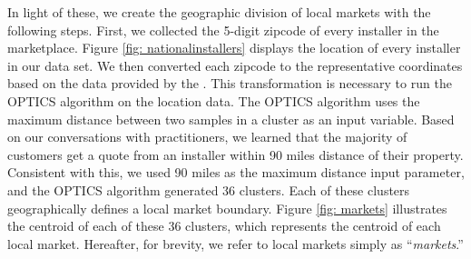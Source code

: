 \documentclass[mnsc,blindrev]{informs3}
\begin{document}
	In light of these, we create the geographic division of local markets with the following steps. First, we collected the 5-digit zipcode of
	every installer in the marketplace. Figure \ref{fig: nationalinstallers} displays the location of every installer in our data set. We then converted each zipcode  to the representative coordinates based on the data provided by the \citet{us_census_bureau_2019}. This transformation is necessary to run the OPTICS algorithm on the location data. The OPTICS algorithm uses the maximum distance between two samples in a cluster as an input variable. Based on our conversations with practitioners, we learned that the majority of customers get a quote from an installer within 90 miles distance of their property. Consistent with this, we used 90 miles as the maximum distance input parameter, and the OPTICS algorithm generated 36 clusters. Each of these clusters geographically defines a local market boundary. Figure \ref{fig: markets} illustrates the centroid of each of these 36 clusters, which represents the centroid of each local market. Hereafter, for brevity, we refer to local markets simply as ``\emph{markets}.''
	
	
	
	
	
\end{document}
